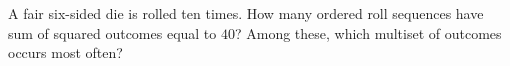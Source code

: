 A fair six-sided die is rolled ten times. How many ordered roll sequences have sum of squared outcomes equal to $40$? Among these, which multiset of outcomes occurs most often?
